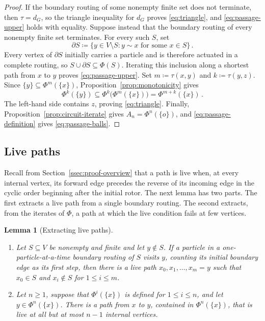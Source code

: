 \documentclass[11pt]{amsart}
\theoremstyle{plain}
\newtheorem{lemma}[theorem]{Lemma}
\theoremstyle{definition}
\begin{document}
	\begin{proof}
		If the boundary routing of some nonempty finite set does not terminate, then
		$\tau=d_G$, so the triangle inequality for $d_G$ proves \eqref{eq:triangle},
		and \eqref{eq:passage-upper} holds with equality.  Suppose instead that the
		boundary routing of every nonempty finite set terminates.  For every such $S$,
		set
		\[
			\partial S\coloneqq\{y\in V\setminus S:y\sim x\text{ for some }x\in S\}\, .
		\]
		Every vertex of $\partial S$
		initially carries a particle and is therefore actuated in a complete
		routing, so $S\cup\partial S\subseteq\Phi(S)$.  Iterating this inclusion
		along a shortest path from $x$ to $y$ proves \eqref{eq:passage-upper}.
		Set $m\coloneqq\tau(x,y)$ and
		$k\coloneqq\tau(y,z)$.  Since $\{y\}\subseteq\Phi^m(\{x\})$,
		Proposition~\ref{prop:monotonicity} gives
		\[
		\Phi^k(\{y\})
		\subseteq\Phi^k\bigl(\Phi^m(\{x\})\bigr)
		=\Phi^{m+k}(\{x\})\, .
		\]
		The left-hand side contains $z$, proving \eqref{eq:triangle}.  Finally,
		Proposition~\ref{prop:circuit-iterate} gives $A_n=\Phi^n(\{o\})$, and
		\eqref{eq:passage-definition} gives \eqref{eq:passage-balls}.
	\end{proof}
	
	\subsection{Live paths}\label{ssec:live-paths}
	
	Recall from Section~\ref{ssec:proof-overview} that a path is live when, at
	every internal vertex, its forward edge precedes the reverse of its incoming
	edge in the cyclic order beginning after the initial rotor.  The next lemma has two parts.  The first extracts a live
	path from a single boundary routing.  The second extracts, from the iterates
	of $\Phi$, a path at which the live condition fails at few vertices.
	
	\begin{lemma}[Extracting live paths]\label{lem:decreasing-positions}
		\leavevmode
		\begin{enumerate}[label=\textup{(\roman*)}]
			\item Let $S\subseteq V$ be nonempty and finite and let $y\notin S$.  If a
			particle in a one-particle-at-a-time boundary routing of $S$ visits $y$,
			counting its initial boundary edge as its first step, then
			there is a live path $x_0,x_1,\ldots,x_m=y$ such that $x_0\in S$ and
			$x_i\notin S$ for $1\leq i\leq m$.
			\item Let $n\geq1$, suppose that $\Phi^i(\{x\})$ is defined for
			$1\leq i\leq n$, and let $y\in\Phi^n(\{x\})$.  There is a path from
			$x$ to $y$, contained in $\Phi^n(\{x\})$, that is live at all but at most
			$n-1$ internal vertices.
		\end{enumerate}
	\end{lemma}
	
\end{document}
